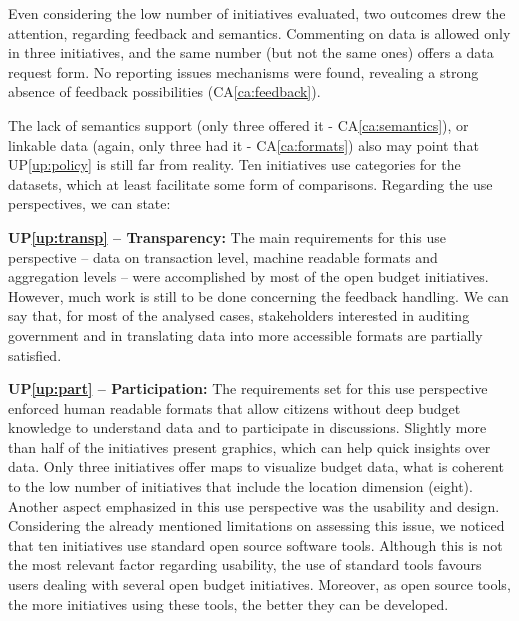 Even considering the low number of initiatives evaluated, two outcomes drew the attention, regarding feedback and semantics. 
Commenting on data is allowed only in three initiatives, and the same number (but not the same ones) offers a data request form.
No reporting issues mechanisms were found, revealing a strong absence of feedback possibilities (CA\ref{ca:feedback}).

The lack of semantics support (only three offered it - CA\ref{ca:semantics}), or linkable data (again, only three had it - CA\ref{ca:formats}) also may point that UP\ref{up:policy} is still far from reality. 
Ten initiatives use categories for the datasets, which at least facilitate some form of comparisons.
Regarding the use perspectives, we can state:


\noindent\textbf{UP\ref{up:transp} -- Transparency:}
The main requirements for this use perspective -- data on transaction level, machine readable formats and aggregation levels -- were accomplished by most of the open budget initiatives. 
However, much work is still to be done concerning the feedback handling.
We can say that, for most of the analysed cases, stakeholders interested in auditing government and in translating data into more accessible formats are partially satisfied.

\vspace{.1cm}

\noindent \textbf{UP\ref{up:part} -- Participation:}
The requirements set for this use perspective enforced human readable formats that allow citizens without deep budget knowledge to understand data and to participate in discussions.
Slightly more than half of the initiatives present graphics, which can help quick insights over data.
Only three initiatives offer maps to visualize budget data, what is coherent to the low number of initiatives that include the location dimension (eight).
Another aspect emphasized in this use perspective was the usability and design. 
Considering the already mentioned limitations on assessing this issue, we noticed that ten initiatives use standard open source software tools. 
Although this is not the most relevant factor regarding usability, the use of standard tools favours users dealing with several open budget initiatives.
Moreover, as open source tools, the more initiatives using these tools, the better they can be developed.

\vspace{.1cm}

